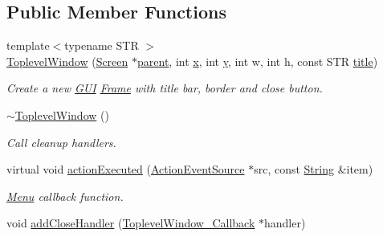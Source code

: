 \subsection*{Public Member Functions}
\begin{DoxyCompactItemize}
\item 
\hypertarget{classGUI_1_1ToplevelWindow_ab159db2520c5188bfd2fdde905d6fc84}{{\footnotesize template$<$typename S\-T\-R $>$ }\\\hyperlink{classGUI_1_1ToplevelWindow_ab159db2520c5188bfd2fdde905d6fc84}{Toplevel\-Window} (\hyperlink{classGUI_1_1Screen}{Screen} $\ast$\hyperlink{classGUI_1_1Window_a2e593ff65e7702178d82fe9010a0b539}{parent}, int \hyperlink{classGUI_1_1Window_a6ca6a80ca00c9e1d8ceea8d3d99a657d}{x}, int \hyperlink{classGUI_1_1Window_a0ee8e923aff2c3661fc2e17656d37adf}{y}, int w, int h, const S\-T\-R \hyperlink{classGUI_1_1ToplevelWindow_a04de191f9a57b5b584657866a4ac6843}{title})}\label{classGUI_1_1ToplevelWindow_ab159db2520c5188bfd2fdde905d6fc84}

\begin{DoxyCompactList}\small\item\em Create a new \hyperlink{namespaceGUI}{G\-U\-I} \hyperlink{classGUI_1_1Frame}{Frame} with title bar, border and close button. \end{DoxyCompactList}\item 
\hypertarget{classGUI_1_1ToplevelWindow_aec4409c59239252910ab01f8f910b925}{\hyperlink{classGUI_1_1ToplevelWindow_aec4409c59239252910ab01f8f910b925}{$\sim$\-Toplevel\-Window} ()}\label{classGUI_1_1ToplevelWindow_aec4409c59239252910ab01f8f910b925}

\begin{DoxyCompactList}\small\item\em Call cleanup handlers. \end{DoxyCompactList}\item 
\hypertarget{classGUI_1_1ToplevelWindow_a6b87e7cc4f8d21d661d29250d6899434}{virtual void \hyperlink{classGUI_1_1ToplevelWindow_a6b87e7cc4f8d21d661d29250d6899434}{action\-Executed} (\hyperlink{classGUI_1_1ActionEventSource}{Action\-Event\-Source} $\ast$src, const \hyperlink{classGUI_1_1String}{String} \&item)}\label{classGUI_1_1ToplevelWindow_a6b87e7cc4f8d21d661d29250d6899434}

\begin{DoxyCompactList}\small\item\em \hyperlink{classGUI_1_1Menu}{Menu} callback function. \end{DoxyCompactList}\item 
\hypertarget{classGUI_1_1ToplevelWindow_a3a046c191d210dbf47ac587be343e642}{void \hyperlink{classGUI_1_1ToplevelWindow_a3a046c191d210dbf47ac587be343e642}{add\-Close\-Handler} (\hyperlink{structGUI_1_1ToplevelWindow__Callback}{Toplevel\-Window\-\_\-\-Callback} $\ast$handler)}\label{classGUI_1_1ToplevelWindow_a3a046c191d210dbf47ac587be343e642}


\end{DoxyCompactItemize}
